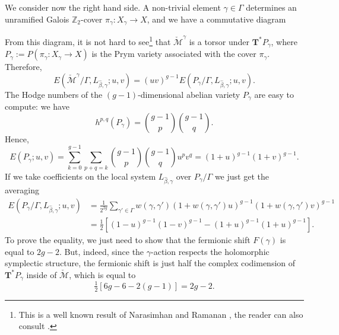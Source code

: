 \documentclass[12pt,a4paper]{amsbook}
\theoremstyle{remark} \newtheorem{rmk}[thm]{Remark}
\theoremstyle{definition} \newtheorem{defn}[thm]{Definition}
\theoremstyle{definition} \newtheorem{ex}[thm]{Example}
\theoremstyle{definition} \newtheorem{ej}{Exercise}
\newcommand{\Z}{\mathbb Z}
\newcommand{\cM}{\mathcal M}
\DeclareMathOperator{\Pic}{Pic}
\DeclareMathOperator{\Nm}{Nm}
\begin{document}
We consider now the right hand side. A non-trivial element $\gamma \in \Gamma$ determines an unramified Galois $\Z_2$-cover $\pi_\gamma:X_\gamma \rightarrow X$, and we have a commutative diagram
\begin{center}
\end{center}
From this diagram, it is not hard to see\footnote{This is a well known result of Narasimhan and Ramanan \cite{NarasimhanRamanan}, the reader can also consult \cite{OscarRamanan}.} that $\check{\cM}^\gamma$ is a torsor under $\bm{T}^* P_\gamma$, where $P_\gamma:=P(\pi_\gamma:X_\gamma\rightarrow X)$ is the Prym variety associated with the cover $\pi_\gamma$. Therefore,
\begin{equation*}
E(\check{\cM}^\gamma/\Gamma,L_{\hat{\beta},\gamma};u,v) = (uv)^{g-1} E(P_\gamma/\Gamma,L_{\hat{\beta},\gamma};u,v).
\end{equation*}
The Hodge numbers of the $(g-1)$-dimensional abelian variety $P_\gamma$ are easy to compute: we have
\begin{equation*}
h^{p,q}(P_\gamma) = {g-1 \choose p}{g-1 \choose q}.
\end{equation*}
Hence,
\begin{equation*}
E(P_\gamma;u,v) = \sum_{k=0}^{g-1} \sum_{p+q = k} {g-1 \choose p}{g-1 \choose q} u^p v^q = (1+u)^{g-1}(1+v)^{g-1}.
\end{equation*}
If we take coefficients on the local system $L_{\hat{\beta},\gamma}$ over $P_\gamma/\Gamma$ we just get the averaging
\begin{align*}
  E(P_\gamma/\Gamma,L_{\hat{\beta},\gamma};u,v) &= \frac{1}{2^{2g}} \sum_{\gamma' \in \Gamma}w(\gamma,\gamma') (1+ w(\gamma,\gamma')u)^{g-1}(1+ w(\gamma,\gamma')v)^{g-1} \\
  & = \tfrac{1}{2}[(1-u)^{g-1}(1-v)^{g-1} - (1+u)^{g-1}(1+u)^{g-1}].
\end{align*}
To prove the equality, we just need to show that the fermionic shift $F(\gamma)$ is equal to $2g-2$. But, indeed, since the $\gamma$-action respects the holomorphic symplectic structure, the fermionic shift is just half the complex codimension of $\bm{T}^* P_\gamma$ inside of $\check{\cM}$, which is equal to
\begin{equation*}
  \tfrac{1}{2}[6g-6 - 2(g-1)] = 2g-2.
\end{equation*}
\end{document}
